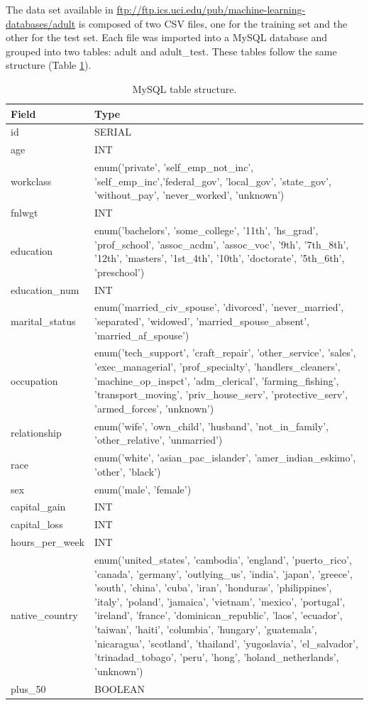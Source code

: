 \documentclass[a4paper]{llncs}
\begin{document}
The data set available in \url{ftp://ftp.ics.uci.edu/pub/machine-learning-databases/adult}
is composed of two CSV files, one for the training set and the other for the test set.
Each file was imported into a MySQL database and grouped into two tables: adult and adult\_test.
These tables follow the same structure (Table \ref{tbl:mysql_table}).

\begin{table}[ht]
  \begin{tabular}{ | l | p{14cm} |}
    \hline
    \textbf{Field} & \textbf{Type} \\ \hline
    id & SERIAL \\ \hline
    age & INT \\ \hline
    workclass & enum('private', 'self\_emp\_not\_inc', 'self\_emp\_inc','federal\_gov', 'local\_gov', 'state\_gov', 'without\_pay', 'never\_worked', 'unknown') \\ \hline
    fnlwgt & INT \\ \hline
    education & enum('bachelors', 'some\_college', '11th', 'hs\_grad', 'prof\_school', 'assoc\_acdm', 'assoc\_voc', '9th', '7th\_8th', '12th', 'masters', '1st\_4th', '10th', 'doctorate', '5th\_6th', 'preschool') \\ \hline
    education\_num & INT \\ \hline
    marital\_status & enum('married\_civ\_spouse', 'divorced', 'never\_married', 'separated', 'widowed', 'married\_spouse\_absent', 'married\_af\_spouse') \\ \hline
    occupation & enum('tech\_support', 'craft\_repair', 'other\_service', 'sales', 'exec\_managerial', 'prof\_specialty', 'handlers\_cleaners', 'machine\_op\_inspct', 'adm\_clerical', 'farming\_fishing', 'transport\_moving', 'priv\_house\_serv', 'protective\_serv', 'armed\_forces', 'unknown') \\ \hline
    relationship & enum('wife', 'own\_child', 'husband', 'not\_in\_family', 'other\_relative', 'unmarried') \\ \hline
    race & enum('white', 'asian\_pac\_islander', 'amer\_indian\_eskimo', 'other', 'black') \\ \hline
    sex & enum('male', 'female') \\ \hline
    capital\_gain & INT \\ \hline
    capital\_loss & INT \\ \hline
    hours\_per\_week & INT \\ \hline
    native\_country & enum('united\_states', 'cambodia', 'england', 'puerto\_rico', 'canada', 'germany', 'outlying\_us', 'india', 'japan', 'greece', 'south', 'china', 'cuba', 'iran', 'honduras', 'philippines', 'italy', 'poland', 'jamaica', 'vietnam', 'mexico', 'portugal', 'ireland', 'france', 'dominican\_republic', 'laos', 'ecuador', 'taiwan', 'haiti', 'columbia', 'hungary', 'guatemala', 'nicaragua', 'scotland', 'thailand', 'yugoslavia', 'el\_salvador', 'trinadad\_tobago', 'peru', 'hong', 'holand\_netherlands', 'unknown') \\ \hline
    plus\_50 & BOOLEAN \\ \hline
  \end{tabular}
  \caption{MySQL table structure.}
  \label{tbl:mysql_table}
\end{table}
\end{document}
